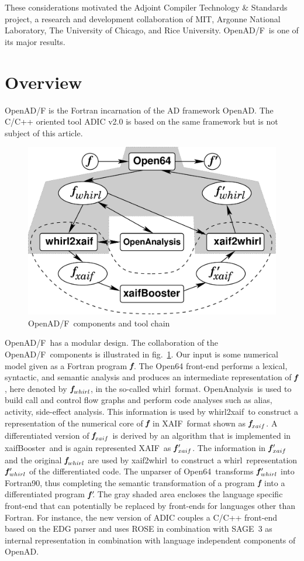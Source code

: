 \documentclass{book}
\newcommand{\OpenADF}{OpenAD/F}
\newcommand{\OpenAD}{OpenAD}
\newcommand{\OpenAnalysis}{OpenAnalysis}
\newcommand{\OpenSixtyFour}{Open64}
\newcommand{\xaif}{XAIF}
\newcommand{\xaifBooster}{xaifBooster}
\newcommand{\whirl}{whirl}
\newcommand{\whirlToxaif}{whirl2xaif}
\newcommand{\xaifTowhirl}{xaif2whirl}
\newcommand{\bmf}{\mbox{\bf\em f}}
\newcommand{\bmfp}{\mbox{\bf\em f$\,^\prime\!\!$}}
\newcommand{\reffig}[1]{{fig.~\ref{#1}}}
\begin{document}
These considerations motivated the 
Adjoint Compiler Technology \& Standards \cite{actsWeb} project, a research and 
development collaboration of MIT, Argonne National Laboratory, 
The University of Chicago, and Rice University. \OpenADF\ is one of its major results.

\section{Overview} \label{sec:overview}
\OpenADF \cite{openadWeb}
is the Fortran incarnation of the AD framework \OpenAD.
The C/C++ oriented tool ADIC v2.0 \cite{adicWeb}
is based on the same framework but is 
not subject of this article.
\begin{figure}
  \centering\includegraphics[width=.5\textwidth]{overview}
  \caption{\OpenADF\ components and tool chain} \label{fig:overview}
\end{figure}
\OpenADF\ has  a modular design. 
The collaboration  of the \OpenADF\ components is illustrated in 
\reffig{fig:overview}.
Our input is some numerical model given as a Fortran program 
$\bmf$.
The \OpenSixtyFour\cite{open64Web}
front-end performs a lexical, 
syntactic, and semantic analysis and produces an 
intermediate representation of $\bmf$, here denoted by $\bmf_{\whirl}$, 
in the so-called \whirl\ format.
\OpenAnalysis\ is used to build call and control flow graphs and  perform 
code analyses such as alias, activity, side-effect analysis.
This information is used by 
\whirlToxaif\ to construct a representation of the numerical core of $\bmf$ in
\xaif\ format shown as $\bmf_{xaif}$.  
A differentiated version of $\bmf_{xaif}$ is derived by an 
algorithm that is implemented in \xaifBooster\ and is again represented 
\xaif\ as $\bmfp_{xaif}$.
The information in $\bmfp_{xaif}$ and the original $\bmf_{\whirl}$ are used by 
\xaifTowhirl\ to construct a 
\whirl\ representation $\bmfp_{\whirl}$ of the differentiated code. 
The unparser of 
\OpenSixtyFour\ transforms $\bmfp_{\whirl}$ into Fortran90, thus completing
the semantic transformation of a program $\bmf$ into
a differentiated program $\bmfp$.
The gray shaded area encloses the language specific front-end that can potentially
be replaced by front-ends for languages other than Fortran. 
For instance, the new version of ADIC \cite{HoNo01} couples a C/C++ 
front-end 
based on the EDG parser \cite{edgWeb} and uses ROSE in combination with SAGE~3 \cite{roseWeb} 
as internal representation in combination with language independent components of \OpenAD.
\end{document}
